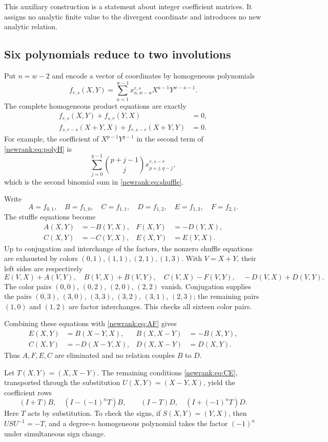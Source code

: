 This auxiliary construction is a statement about integer coefficient
matrices.  It assigns no analytic finite value to the divergent
coordinate and introduces no new analytic relation.

\subsection{Six polynomials reduce to two involutions}

Put $n=w-2$ and encode a vector of coordinates by homogeneous polynomials
\[
 f_{r,s}(X,Y)=\sum_{a=1}^{w-1}
 x_{a,w-a}^{r,s}X^{a-1}Y^{w-a-1}.
\]
The complete homogeneous product equations are exactly
\begin{align}
 f_{r,s}(X,Y)+f_{s,r}(Y,X)&=0,\label{newrank:eq:polyS}\\
 f_{s,r-s}(X+Y,X)+f_{r,s-r}(X+Y,Y)&=0.
 \label{newrank:eq:polyH}
\end{align}
For example, the coefficient of $X^{p-1}Y^{q-1}$ in the second term of
\eqref{newrank:eq:polyH} is
\[
 \sum_{j=0}^{q-1}\binom{p+j-1}{j}x_{p+j,q-j}^{r,s-r},
\]
which is the second binomial sum in \eqref{newrank:eq:shuffle}.

Write
\[
 A=f_{0,1},\quad B=f_{1,0},\quad C=f_{1,1},\quad
 D=f_{1,2},\quad E=f_{1,3},\quad F=f_{2,1}.
\]
The stuffle equations become
\begin{align}
 A(X,Y)&=-B(Y,X),&F(X,Y)&=-D(Y,X),\label{newrank:eq:AF}\\
 C(X,Y)&=-C(Y,X),&E(X,Y)&=E(Y,X).
 \label{newrank:eq:CE}
\end{align}
Up to conjugation and interchange of the factors, the nonzero shuffle
equations are exhausted by colors $(0,1),(1,1),(2,1),(1,3)$.
With $V=X+Y$, their left sides are respectively
\[
 E(V,X)+A(V,Y),\quad B(V,X)+B(V,Y),\quad
 C(V,X)-F(V,Y),\quad -D(V,X)+D(V,Y).
\]
The color pairs $(0,0)$, $(0,2)$, $(2,0)$, $(2,2)$ vanish. Conjugation supplies
the pairs $(0,3)$, $(3,0)$, $(3,3)$, $(3,2)$, $(3,1)$, $(2,3)$; the remaining pairs
$(1,0)$ and $(1,2)$ are factor interchanges.  This checks all sixteen
color pairs.

Combining these equations with \eqref{newrank:eq:AF} gives
\begin{align}
 E(X,Y)&=B(X-Y,X),& B(X,X-Y)&=-B(X,Y),\label{newrank:eq:B}\\
 C(X,Y)&=-D(X-Y,X),& D(X,X-Y)&=D(X,Y).
 \label{newrank:eq:D}
\end{align}
Thus $A,F,E,C$ are eliminated and no relation couples $B$ to $D$.

Let $T(X,Y)=(X,X-Y)$.  The remaining conditions
\eqref{newrank:eq:CE}, transported through the substitution
$U(X,Y)=(X-Y,X)$, yield the coefficient rows
\begin{equation}\label{newrank:eq:normal}
 (I+T)B,\quad (I-(-1)^nT)B,\qquad
 (I-T)D,\quad (I+(-1)^nT)D.
\end{equation}
Here $T$ acts by substitution.  To check the signs, if $S(X,Y)=(Y,X)$,
then $USU^{-1}=-T$, and a degree-$n$ homogeneous polynomial takes the
factor $(-1)^n$ under simultaneous sign change.

